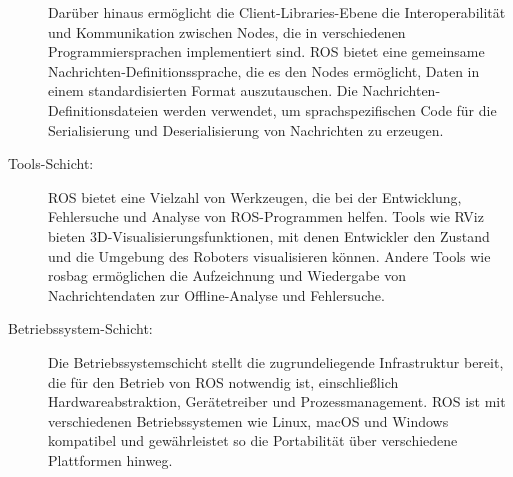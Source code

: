 \begin{description}
    Darüber hinaus ermöglicht die Client-Libraries-Ebene die Interoperabilität und Kommunikation zwischen Nodes, die in verschiedenen Programmiersprachen implementiert sind. \ac{ROS} bietet eine gemeinsame Nachrichten-Definitionssprache, die es den Nodes ermöglicht, Daten in einem standardisierten Format auszutauschen. Die Nachrichten-Definitionsdateien werden verwendet, um sprachspezifischen Code für die Serialisierung und Deserialisierung von Nachrichten zu erzeugen.
    
    \cite[vgl.][]{client-libraries}
   
    
    \item[Tools-Schicht:] \ac{ROS}  bietet eine Vielzahl von Werkzeugen, die bei der Entwicklung, Fehlersuche und Analyse von ROS-Programmen helfen. Tools wie RViz bieten 3D-Visualisierungsfunktionen, mit denen Entwickler den Zustand und die Umgebung des Roboters visualisieren können. Andere Tools wie rosbag ermöglichen die Aufzeichnung und Wiedergabe von Nachrichtendaten zur Offline-Analyse und Fehlersuche.
    
    \cite[vgl.][]{ros-tools}
    
    \item[Betriebssystem-Schicht:] Die Betriebssystemschicht stellt die zugrundeliegende Infrastruktur bereit, die für den Betrieb von \ac{ROS} notwendig ist, einschließlich Hardwareabstraktion, Gerätetreiber und Prozessmanagement. \ac{ROS}  ist mit verschiedenen Betriebssystemen wie Linux, macOS und Windows kompatibel und gewährleistet so die Portabilität über verschiedene Plattformen hinweg.
    
    \cite[vgl.][]{ROSIntroduction}

\end{description}

